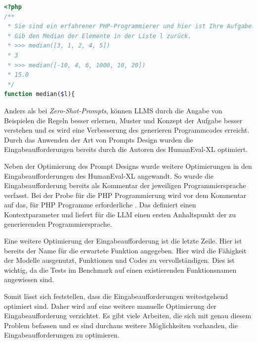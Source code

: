 \begin{lstlisting}[language=php,caption={Prompt Beispiel für  eine Aufgabe aus dem HumanEval-XL Benchmark},label=lst:example_prompt_by_humaneval_benchmark]
<?php
/**
 * Sie sind ein erfahrener PHP-Programmierer und hier ist Ihre Aufgabe.
 * Gib den Median der Elemente in der Liste l zurück.
 * >>> median([3, 1, 2, 4, 5])
 * 3
 * >>> median([-10, 4, 6, 1000, 10, 20])
 * 15.0
 */
function median($l){
\end{lstlisting}

Anders als bei \textit{Zero-Shot-Prompts}, können LLMS durch die Angabe von Beispielen die Regeln besser erlernen, Muster und Konzept der Aufgabe besser verstehen und es wird eine Verbesserung des generieren Programmcodes erreicht. Durch das Anwenden der Art von Prompts Design wurden die Eingabeaufforderungen bereits durch die Autoren des HumanEval-XL optimiert.\vspace{0.2cm}

Neben der Optimierung des Prompt Designs wurde weitere Optimierungen in den Eingabeaufforderungen des HumanEval-XL angewandt. So wurde die Eingabeaufforderung bereits als Kommentar der jeweiligen Programmiersprache verfasst. Bei der Probe für die PHP Programmierung wird vor dem Kommentar auf das, für PHP Programme erforderliche . Das definiert einen Kontextparameter und liefert für die LLM einen ersten Anhaltspunkt der zu generierenden Programmiersprache.\vspace{0.2cm}

Eine weitere Optimierung der Eingabeaufforderung ist die letzte Zeile. Hier ist bereits der Name für die erwartete Funktion angegeben. Hier wird die Fähigkeit der Modelle ausgenutzt, Funktionen und Codes zu vervollständigen. Dies ist wichtig, da die Tests im Benchmark auf einen existierenden Funktionsnamen angewiesen sind.\vspace{0.2cm}

Somit lässt sich feststellen, dass die Eingabeaufforderungen weitestgehend optimiert sind. Daher wird auf eine weitere manuelle Optimierung der Eingabeaufforderung verzichtet. Es gibt viele Arbeiten, die sich mit genau diesem Problem befassen und es sind durchaus weitere Möglichkeiten vorhanden, die Eingabeaufforderungen zu optimieren.\vspace{0.2cm}


